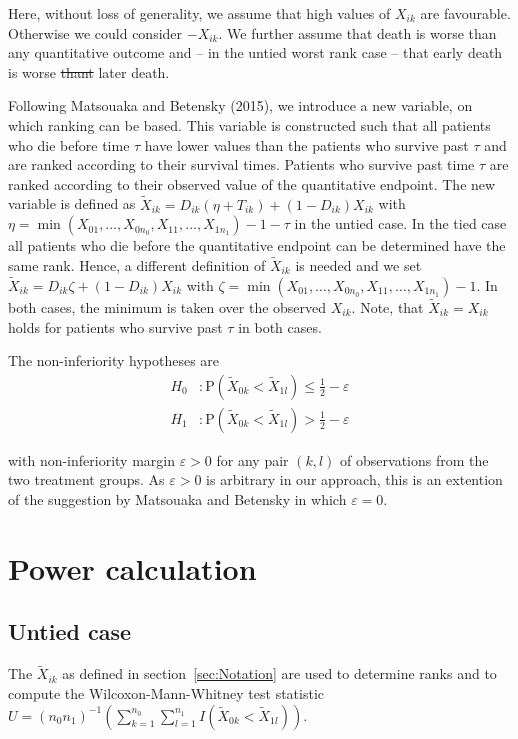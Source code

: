 \documentclass[bimj,fleqn]{w-art}\usepackage[]{graphicx}\usepackage[]{color}
\theoremstyle{plain}
\theoremstyle{definition}
\providecommand{\DIFadd}[1]{{\protect\color{blue}\uwave{#1}}} %
\providecommand{\DIFdel}[1]{{\protect\color{red}\sout{#1}}}                      %
\providecommand{\DIFaddbegin}{} %
\providecommand{\DIFaddend}{} %
\providecommand{\DIFdelbegin}{} %
\providecommand{\DIFdelend}{} %
\newcommand{\DIFscaledelfig}{0.5}
\newlength{\DIFdelgraphicswidth} %
\newlength{\DIFdelgraphicsheight} %
\newcommand{\DIFaddincludegraphics}[2][]{{\color{blue}\fbox{\DIFOincludegraphics[#1]{#2}}}} %
\newcommand{\DIFdelincludegraphics}[2][]{%
\sbox{\DIFdelgraphicsbox}{\DIFOincludegraphics[#1]{#2}}%
\settoboxwidth{\DIFdelgraphicswidth}{\DIFdelgraphicsbox} %
\settoboxtotalheight{\DIFdelgraphicsheight}{\DIFdelgraphicsbox} %
\scalebox{\DIFscaledelfig}{%
\parbox[b]{\DIFdelgraphicswidth}{\usebox{\DIFdelgraphicsbox}\\[-\baselineskip] \rule{\DIFdelgraphicswidth}{0em}}\llap{\resizebox{\DIFdelgraphicswidth}{\DIFdelgraphicsheight}{%
\setlength{\unitlength}{\DIFdelgraphicswidth}%
\begin{picture}(1,1)%
\thicklines\linethickness{2pt} %
{\color[rgb]{1,0,0}\put(0,0){\framebox(1,1){}}}%
{\color[rgb]{1,0,0}\put(0,0){\line( 1,1){1}}}%
{\color[rgb]{1,0,0}\put(0,1){\line(1,-1){1}}}%
\end{picture}%
}\hspace*{3pt}}} %
} %
\DeclareRobustCommand{\DIFaddbegin}{\DIFOaddbegin \let\includegraphics\DIFaddincludegraphics} %
\DeclareRobustCommand{\DIFaddend}{\DIFOaddend \let\includegraphics\DIFOincludegraphics} %
\DeclareRobustCommand{\DIFdelbegin}{\DIFOdelbegin \let\includegraphics\DIFdelincludegraphics} %
\DeclareRobustCommand{\DIFdelend}{\DIFOaddend \let\includegraphics\DIFOincludegraphics} %
\begin{document}
Here, without loss of generality, we assume that high values of $X_{ik}$ are
favourable. Otherwise we could consider $-X_{ik}$. We further assume that
death is worse than any quantitative outcome and -- in the untied worst rank
case -- that early death is worse \DIFdelbegin \DIFdel{thant }\DIFdelend \DIFaddbegin \DIFadd{than }\DIFaddend later death.

Following Matsouaka and Betensky (2015), we introduce a new variable, on which
ranking can be based. This variable is constructed such that all patients who
die before time $\tau$ have lower values than the patients who survive past
$\tau$ and are ranked according to their survival times. Patients who survive
past time $\tau$ are ranked according to their observed value of the
quantitative endpoint. The new variable is defined as
$\widetilde{X}_{ik} = D_{ik}(\eta  + T_{ik}) + (1 - D_{ik})X_{ik}$ with
$\eta = \min(X_{01}, \ldots, X_{0n_0}, X_{11}, \ldots, X_{1n_1}) - 1 - \tau$
in the untied case. In the tied case all patients who die before the
quantitative endpoint can be determined have the same rank. Hence, a different
definition of $\widetilde{X}_{ik}$ is needed and we set
$\widetilde{X}_{ik} = D_{ik}\zeta   + (1 - D_{ik})X_{ik}$ with
$\zeta = \min(X_{01}, \ldots, X_{0n_0}, X_{11}, \ldots, X_{1n_1}) - 1$.
In both cases, the minimum is taken over the observed $X_{ik}$. Note, that
$\widetilde{X}_{ik} = {X}_{ik}$ holds for patients who survive past $\tau$ in
both cases.

The non-inferiority hypotheses are
\begin{align*}
  H_0 &:  \text{P}(\widetilde{X}_{0k} < \widetilde{X}_{1l})
          \leq \frac{1}{2} - \varepsilon \\
H_1 &:  \text{P}(\widetilde{X}_{0k} < \widetilde{X}_{1l})
          > \frac{1}{2} - \varepsilon
\end{align*}

with non-inferiority margin $\varepsilon > 0$ for any pair $(k, l)$ of
observations from the two treatment groups. As $\varepsilon > 0 $ is arbitrary
in our approach, this is an extention of the suggestion by Matsouaka and
Betensky in which $\varepsilon = 0 $.

\section{Power calculation}
\label{sec:Power}
\subsection{Untied case}
\label{sec:PowerUntied}
The $\widetilde{X}_{ik}$ as defined in section~\ref{sec:Notation} are used to
determine ranks and to compute the Wilcoxon-Mann-Whitney test statistic
$ U =(n_0 n_1)^{-1}(\sum_{k=1}^{n_0}
    \sum_{l=1}^{n_1}I(\widetilde{X}_{0k} < \widetilde{X}_{1l})) $.
\end{document}
